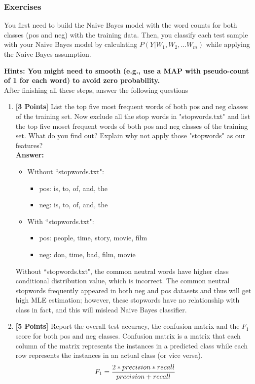 \documentclass{article}
\begin{document}
\subsubsection*{Exercises}
You first need to build the Naive Bayes model with the word counts for both classes (pos and neg) with the training data. Then, you classify each test sample with your Naive Bayes model by calculating  $P(Y | W_1, W_2, ...W_m)$ while applying the Naive Bayes assumption.

 \textbf{Hints: You might need to smooth (e.g., use a MAP with pseudo-count of 1 for each word) to avoid zero probability. }
\\ After finishing all these steps, answer the following questions

\begin{enumerate}
	\item \textbf{[3 Points]} List the top five most frequent words of both pos and neg classes of the training set. Now exclude all the stop words in "stopwords.txt" and list the top five moset frequent words of both pos and neg classes of the training set. What do you find out? Explain why not apply those "stopwords" as our features?\\
	\textbf{Answer:}\\
	\begin{itemize}
		\item Without ``stopwords.txt":
		\begin{itemize}
			\item pos: is, to, of, and, the
			\item neg: is, to, of, and, the
		\end{itemize}
		\item With ``stopwords.txt":
		\begin{itemize}
			\item pos: people, time, story, movie, film
			\item neg: don, time, bad, film, movie
		\end{itemize}
	\end{itemize} 
	Without ``stopwords.txt", the common neutral words have higher class conditional distribution value, which is incorrect. The common neutral stopwords frequently appeared in both neg and pos datasets and thus will get high MLE estimation; however, these stopwords have no relationship with class in fact, and this will mislead Naive Bayes classifier. 
	
 	\item \textbf{[5 Points]} Report the overall test accuracy, the confusion matrix and the $F_1$ score for both pos and neg classes. Confusion matrix is a matrix that each column of the matrix represents the instances in a predicted class while each row represents the instances in an actual class (or vice versa).   
	\begin{equation}\label{eqn:f1score}
	\ F_1 =  {2*precision*recall\over precision + recall}
	\end{equation}
	

\end{enumerate}
\end{document}

